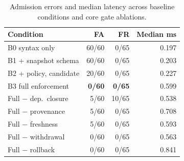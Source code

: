 \documentclass[letterpaper,journal]{IEEEtran}
\begin{document}
\begin{table}[t]\caption{Admission errors and median latency across baseline conditions and core gate ablations.}\label{tab:rq2}\centering\footnotesize
\begin{tabular}{lrrr}\toprule
Condition & FA & FR & Median ms\\\midrule
B0 syntax only & 60/60 & 0/65 & 0.197\\
B1 + snapshot schema & 60/60 & 0/65 & 0.203\\
B2 + policy, candidate & 20/60 & 0/65 & 0.227\\
B3 full enforcement & \textbf{0/60} & \textbf{0/65} & 0.599\\\midrule
Full $-$ dep.\ closure & 5/60 & 10/65 & 0.538\\
Full $-$ provenance & 5/60 & 0/65 & 0.708\\
Full $-$ freshness & 5/60 & 0/65 & 0.593\\
Full $-$ withdrawal & 0/60 & 0/65 & 0.563\\
Full $-$ rollback & 0/60 & 0/65 & 0.841\\\bottomrule
\end{tabular}\end{table}
\end{document}
